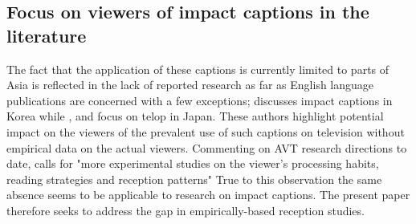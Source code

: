 \documentclass[output=paper]{langsci/langscibook}
\begin{document}
\subsection{Focus on viewers of impact captions in the literature}

The fact that the application of these captions is currently limited to parts of Asia is reflected in the lack of reported research as far as English language publications are concerned with a few exceptions; \citet{Park2009} discusses impact captions in Korea while \citet{ohagan2010}, \citet{Sasamoto2014} and \citet{maree2015} focus on telop in Japan. These authors highlight potential impact on the viewers of the prevalent use of such captions on television without empirical data on the actual viewers. Commenting on AVT research directions to date, \citet[p. 57]{gambier2013} calls for "more experimental studies on the viewer's processing habits, reading strategies and reception patterns" True to this observation the same absence seems to be applicable to research on impact captions. The present paper therefore seeks to address the gap in empirically-based reception studies.
\end{document}
